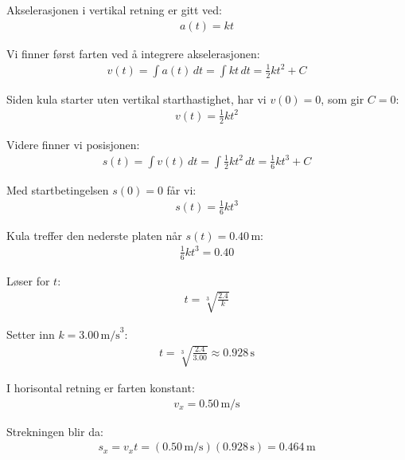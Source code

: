 \subsubsection{}

Akselerasjonen i vertikal retning er gitt ved:
\begin{align}
a(t) = kt
\end{align}

Vi finner først farten ved å integrere akselerasjonen:
\begin{align}
v(t) = \int a(t)\,dt = \int kt\,dt = \frac{1}{2}kt^2 + C
\end{align}

Siden kula starter uten vertikal starthastighet, har vi $v(0)=0$, som gir $C=0$:
\begin{align}
v(t) = \frac{1}{2}kt^2
\end{align}

Videre finner vi posisjonen:
\begin{align}
s(t) = \int v(t)\,dt = \int \frac{1}{2}kt^2\,dt = \frac{1}{6}kt^3 + C
\end{align}

Med startbetingelsen $s(0)=0$ får vi:
\begin{align}
s(t) = \frac{1}{6}kt^3
\end{align}

Kula treffer den nederste platen når $s(t) = 0.40\,\text{m}$:
\begin{align}
\frac{1}{6}kt^3 = 0.40
\end{align}

Løser for $t$:
\begin{align}
t = \sqrt[3]{\frac{2.4}{k}}
\end{align}

Setter inn $k = 3.00\,\text{m/s}^3$:
\begin{align}
t = \sqrt[3]{\frac{2.4}{3.00}} \approx 0.928\,\text{s}
\end{align}

I horisontal retning er farten konstant:
\begin{align}
v_x = 0.50\,\text{m/s}
\end{align}

Strekningen blir da:
\begin{align}
s_x = v_x t = (0.50\,\text{m/s})(0.928\,\text{s}) = 0.464\,\text{m}
\end{align}

\newpage